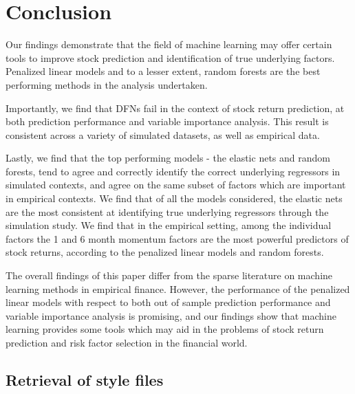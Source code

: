 \documentclass{article}
\begin{document}

\section{Conclusion}

Our findings demonstrate that the field of machine learning may offer certain tools to improve stock prediction and identification of true underlying factors. Penalized linear models and to a lesser extent, random forests are the best performing methods in the analysis undertaken.

Importantly, we find that DFNs fail in the context of stock return prediction, at both prediction performance and variable importance analysis. This result is consistent across a variety of simulated datasets, as well as empirical data. 

Lastly, we find that the top performing models - the elastic nets and random forests, tend to agree and correctly identify the correct underlying regressors in simulated contexts, and agree on the same subset of factors which are important in empirical contexts. We find that of all the models considered, the elastic nets are the most consistent at identifying true underlying regressors through the simulation study. We find that in the empirical setting, among the individual factors the 1 and 6 month momentum factors are the most powerful predictors of stock returns, according to the penalized linear models and random forests. 

The overall findings of this paper differ from the sparse literature on machine learning methods in empirical finance. However, the performance of the penalized linear models with respect to both out of sample prediction performance and variable importance analysis is promising, and our findings show that machine learning provides some tools which may aid in the problems of stock return prediction and risk factor selection in the financial world. 

\newpage

\subsection{Retrieval of style files}
\end{document}
